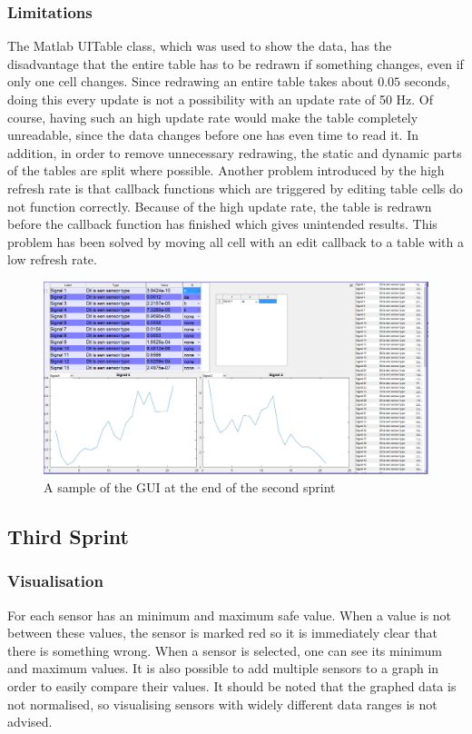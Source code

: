\subsubsection{Limitations}

The Matlab UITable class, which was used to show the data, has the disadvantage that the entire table has to be redrawn if something changes, even if only one cell changes. Since redrawing an entire table takes about $0.05$ seconds, 
doing this every update is not a possibility with an update rate of 50 Hz. Of course, having such an high update rate would make the table completely unreadable, since the data changes before one has even time to read it. In addition, in order to remove unnecessary redrawing, the static and dynamic parts of the tables are split where possible. Another problem introduced by the high refresh rate is that callback functions which are triggered by editing table cells do not function correctly. Because of the high update rate, the table is redrawn before the callback function has finished which gives unintended results. This problem has been solved by moving all cell with an edit callback to a table with a low refresh rate. 

\begin{figure}[H]
	\centering
	\includegraphics[width=.75\textwidth]{images/GUIV1}
	\caption{A sample of the GUI at the end of the second sprint} 
	\label{fig:GUIV1}
\end{figure} 

\subsection{Third Sprint}

\subsubsection{Visualisation}
For each sensor has an minimum and maximum safe value. When a value is not between these values, the sensor is marked red so it is immediately clear that there is something wrong. When a sensor is selected, one can see its minimum and maximum values. It is also possible to add multiple sensors to a graph in order to easily compare their values. It should be noted that the graphed data is not normalised, so visualising sensors with widely different data ranges is not advised.  

